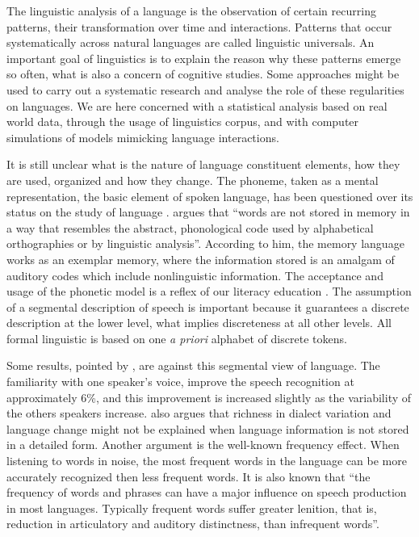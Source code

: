The linguistic analysis of a language is the observation of certain recurring patterns,
their transformation over time and interactions. 
Patterns that occur systematically across natural languages are called linguistic universals. 
An important goal of linguistics is to explain the reason why these patterns emerge so often,
what is also a concern of cognitive studies.
Some approaches might be used to carry out a systematic research and analyse the role of 
these regularities on languages. We are here concerned with a statistical analysis based 
on real world data, through the usage of linguistics corpus, and with computer simulations
of models mimicking language interactions. 

It is still unclear what is the nature of language constituent elements, how they are used, organized and
how they change. The phoneme, taken as a mental representation, the basic element of spoken language, 
has been questioned over its status on the study of language \citep{port2007,port2005,port2006}.
\cite{port2007} argues that ``words are not stored in memory in a way that resembles the abstract, 
phonological code used by alphabetical orthographies or by linguistic analysis''. 
According to him, the memory language works as an exemplar memory, where the information stored is an amalgam 
of auditory codes which include nonlinguistic information. The acceptance and usage of the phonetic model is 
a reflex of our literacy education \citep{port2007,coleman2002}. The assumption of a segmental description of 
speech is important because it guarantees a discrete description at the lower level, what implies discreteness 
at all other levels. All formal linguistic is based on one \textit{a priori} alphabet of discrete tokens.

Some results, pointed by \cite{port2007}, are against this segmental view of language. 
The familiarity with one speaker's voice, improve the speech recognition at approximately 6\%, 
and this improvement is increased slightly as the variability of the others speakers increase. 
\cite{port2007} also argues that richness in dialect variation and language change might not be explained 
when language information is not stored in a detailed form. Another argument is the well-known frequency effect. 
When listening to words in noise, the most frequent words in the language can be more accurately recognized 
then less frequent words. It is also known that ``the frequency of words and phrases can have a major influence 
on speech production in most languages. Typically frequent words suffer greater lenition, that is, 
reduction in articulatory and auditory distinctness, than infrequent words''\citep{port2007}. 

